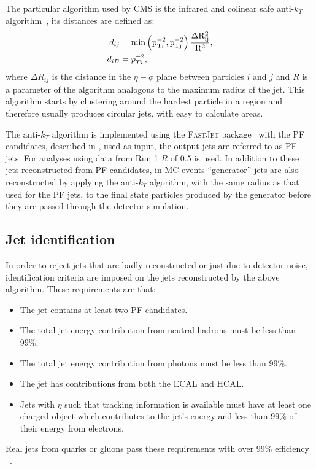 The particular algorithm used by CMS is the infrared and colinear safe anti-$k_{T}$ algorithm~\cite{1126-6708-2008-04-063}, its distances are defined as:
\begin{align}
d_{ij}&=\rm{min}\left(p_{Ti}^{-2},p_{Tj}^{-2}\right)\frac{\Delta R_{ij}^{2}}{R^{2}},\\
d_{iB}&=p_{Ti}^{-2},
\end{align}
where $\Delta R_{ij}$ is the distance in the $\eta-\phi$ plane between particles $i$ and $j$ and $R$ is a parameter of the algorithm analogous to the maximum radius of the jet. This algorithm starts by clustering around the hardest particle in a region and therefore usually produces circular jets, with easy to calculate areas.

The anti-$k_{T}$ algorithm is implemented using the \textsc{FastJet} package~\cite{Cacciari:fastjet1} with the \ac{PF} candidates, described in , used as input, the output jets are referred to as \ac{PF} jets. For analyses using data from \LHC Run 1 $R$ of 0.5 is used. In addition to these jets reconstructed from \ac{PF} candidates, in \ac{MC} events ``generator'' jets are also reconstructed by applying the anti-$k_{T}$ algorithm, with the same radius as that used for the \ac{PF} jets, to the final state particles produced by the generator before they are passed through the detector simulation.

\subsection{Jet identification}
\label{sec:jetid}
In order to reject jets that are badly reconstructed or just due to detector noise, identification criteria are imposed on the jets reconstructed by the above algorithm. These requirements are that:
\begin{itemize}
\item The jet contains at least two \ac{PF} candidates.
\item The total jet energy contribution from neutral hadrons must be less than 99\%.
\item The total jet energy contribution from photons must be less than 99\%.
\item The jet has contributions from both the \ac{ECAL} and \ac{HCAL}.
\item Jets with $\eta$ such that tracking information is available must have at least one charged object which contributes to the jet's energy and less than 99\% of their energy from electrons.
\end{itemize}
Real jets from quarks or gluons pass these requirements with over 99\% efficiency ~\cite{ARTICLE:CMSAN-14-227}.

